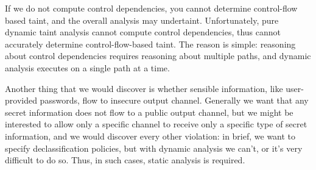 If we do not compute control dependencies, you cannot determine control-flow based taint, and the overall analysis may undertaint. Unfortunately, pure dynamic taint analysis cannot compute control dependencies, thus cannot accurately determine control-flow-based taint. The reason is simple: reasoning about control dependencies requires reasoning about multiple paths, and dynamic analysis executes on a single path at a time.

Another thing that we would discover is whether sensible information, like user-provided passwords, flow to insecure output channel. Generally we want that any secret information does not flow to a public output channel, but we might be interested to allow only a specific channel to receive only a specific type of secret information, and we would discover every other violation: in brief, we want to specify declassification policies, but with dynamic analysis we can't, or it's very difficult to do so. Thus, in such cases, static analysis is required.